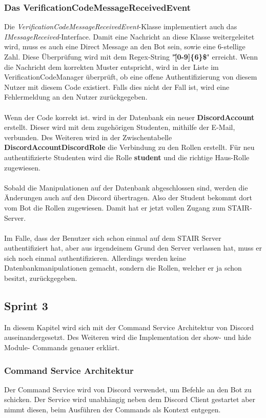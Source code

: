 \documentclass[a4paper, table]{article}
\begin{document}
\subsubsection*{Das VerificationCodeMessageReceivedEvent}
Die \textit{VerificationCodeMessageReceivedEvent}-Klasse implementiert auch das \textit{IMessageReceived}-Interface.
Damit eine Nachricht an diese Klasse weitergeleitet wird, muss es auch eine Direct Message an den Bot sein, 
sowie eine 6-stellige Zahl. 
Diese Überprüfung wird mit dem Regex-String "\textbf{\^[0-9]\{6\}\$}" erreicht.
Wenn die Nachricht dem korrekten Muster entspricht, wird in der Liste im VerificationCodeManager überprüft, 
ob eine offene Authentifizierung von diesem Nutzer mit diesem Code existiert.
Falls dies nicht der Fall ist, wird eine Fehlermeldung an den Nutzer zurückgegeben.\\\\
Wenn der Code korrekt ist. wird in der Datenbank ein neuer \textbf{DiscordAccount} erstellt.
Dieser wird mit dem zugehörigen Studenten, mithilfe der E-Mail, verbunden.
Des Weiteren wird in der Zwischentabelle \textbf{DiscordAccountDiscordRole} die Verbindung zu den Rollen erstellt.
Für neu authentifizierte Studenten wird die Rolle \textbf{student} und die richtige Haus-Rolle zugewiesen.\\\\
Sobald die Manipulationen auf der Datenbank abgeschlossen sind, werden die Änderungen auch auf den Discord übertragen.
Also der Student bekommt dort vom Bot die Rollen zugewiesen.
Damit hat er jetzt vollen Zugang zum STAIR-Server.\\\\
Im Falle, dass der Benutzer sich schon einmal auf dem STAIR Server authentifiziert hat, 
aber aus irgendeinem Grund den Server verlassen hat, muss er sich noch einmal authentifizieren.
Allerdings werden keine Datenbankmanipulationen gemacht, sondern die Rollen, welcher er ja schon besitzt, zurückgegeben.

\newpage
\subsection{Sprint 3}
In diesem Kapitel wird sich mit der Command Service Architektur von Discord auseinandergesetzt.
Des Weiteren wird die Implementation der show- und hide Module- Commands genauer erklärt.

\subsubsection{Command Service Architektur}
Der Command Service wird von Discord verwendet, um Befehle an den Bot zu schicken.
Der Service wird unabhängig neben dem Discord Client gestartet aber nimmt diesen, beim Ausführen der Commands als Kontext entgegen.
\end{document}
